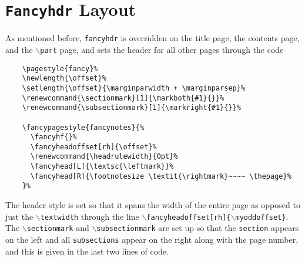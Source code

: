 \documentclass[10pt]{article}
\begin{document}
	\section{\texttt{Fancyhdr} Layout}
	As mentioned before, \texttt{fancyhdr} is overridden on the title page, the contents page, and the \texttt{$\backslash$part} page, and sets the header for all other pages through the code
	\begin{verbatim}
	\pagestyle{fancy}%
	\newlength{\offset}%
	\setlength{\offset}{\marginparwidth + \marginparsep}%
	\renewcommand{\sectionmark}[1]{\markboth{#1}{}}%
	\renewcommand{\subsectionmark}[1]{\markright{#1}{}}%

	\fancypagestyle{fancynotes}{%
	  \fancyhf{}%
	  \fancyheadoffset[rh]{\offset}%
	  \renewcommand{\headrulewidth}{0pt}%
	  \fancyhead[L]{\textsc{\leftmark}}%
	  \fancyhead[R]{\footnotesize \textit{\rightmark}~~~~ \thepage}%
	}%
	\end{verbatim}
	The header style is set so that it spans the width of the entire page as opposed to just the \texttt{$\backslash$textwidth} through the line \texttt{$\backslash$fancyheadoffset[rh]\{$\backslash$myoddoffset\}}. The \texttt{$\backslash$sectionmark} and \texttt{$\backslash$subsectionmark} are set up so that the \texttt{section} appears on the left and all \texttt{subsections} appear on the right along with the page number, and this is given in the last two lines of code.
\end{document}
